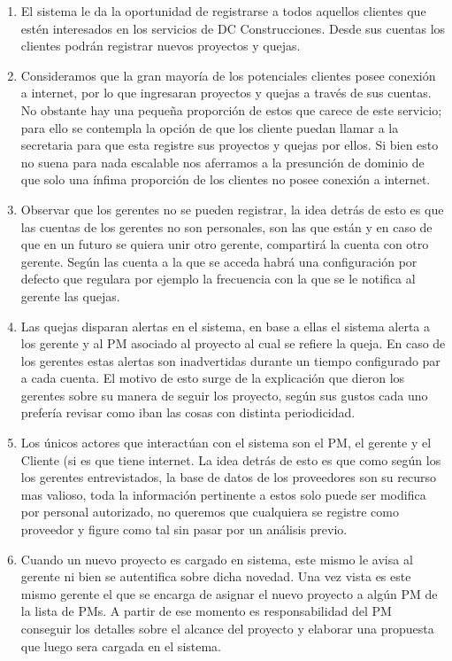 \documentclass{article}
\theoremstyle{definition}
\theoremstyle{remark}
\begin{document}
\begin{enumerate}
    \item El sistema le da la oportunidad de registrarse a todos aquellos clientes que estén interesados en los servicios de DC Construcciones. Desde sus cuentas los clientes podrán registrar nuevos proyectos y quejas.
    
    \item Consideramos que la gran mayoría de los potenciales clientes posee conexión a internet, por lo que ingresaran proyectos y quejas a través de sus cuentas. No obstante hay una pequeña proporción de estos que carece de este servicio; para ello se contempla la opción de que los cliente puedan llamar a la secretaria para que esta registre sus proyectos y quejas por ellos. Si bien esto no suena para nada escalable nos aferramos a la presunción de dominio de que solo una ínfima proporción de los clientes no posee conexión a internet.
    
     \item Observar que los gerentes no se pueden registrar, la idea detrás de esto es que las cuentas de los gerentes no son personales, son las que están y en caso de que en un futuro se quiera unir otro gerente, compartirá la cuenta con otro gerente. Según las cuenta a la que se acceda habrá una configuración por defecto que regulara por ejemplo la frecuencia con la que se le notifica al gerente las quejas.
    
    \item Las quejas disparan alertas en el sistema, en base a ellas el sistema alerta a los gerente y al PM asociado al proyecto al cual se refiere la queja. En caso de los gerentes estas alertas son inadvertidas durante un tiempo configurado par a cada cuenta. El motivo de esto surge de la explicación que dieron los gerentes sobre su manera de seguir los proyecto, según sus gustos cada uno prefería revisar como iban las cosas con distinta periodicidad.
    
    \item Los únicos actores que interactúan con el sistema son el PM, el gerente y el Cliente (si es que tiene internet. La idea detrás de esto es que como según los los gerentes entrevistados, la base de datos de los proveedores son su recurso mas valioso, toda la información pertinente a estos solo puede ser modifica por personal autorizado, no queremos que cualquiera se registre como proveedor y figure como tal sin pasar por un análisis previo.
    
    \item Cuando un nuevo proyecto es cargado en sistema, este mismo le avisa al gerente ni bien se autentifica sobre dicha novedad. Una vez vista es este mismo gerente el que se encarga de asignar el nuevo proyecto a algún PM de la lista de PMs. A partir de ese momento es responsabilidad del PM conseguir los detalles sobre el alcance del proyecto y elaborar una propuesta que luego sera cargada en el sistema.
    

\end{enumerate}
\end{document}
